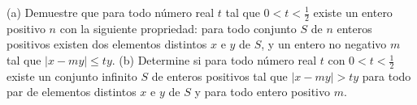 (a) Demuestre que para todo número real $t$ tal que $0 \lt t \lt \frac12$
 existe un entero positivo $n$ con la
siguiente propriedad: para todo conjunto $S$ de $n$ enteros positivos existen dos elementos distintos
$x$ e $y$ de $S$, y un entero no negativo $m$ tal que $\left|x - my\right| \leq ty.$\newline
(b) Determine si para todo número real $t$ con $0 \lt t \lt \frac12$ existe un conjunto infinito $S$ de enteros
positivos tal que $\left|x - my\right| \gt ty$ para todo par de elementos distintos $x$ e $y$ de $S$ y para todo entero positivo $m$.